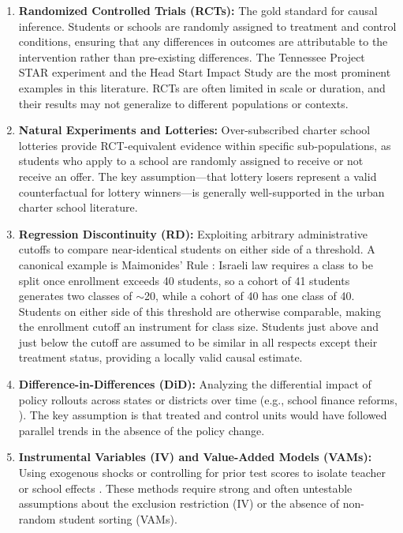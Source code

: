 \documentclass[12pt,letterpaper]{article}
\begin{document}
\begin{enumerate}
    \item \textbf{Randomized Controlled Trials (RCTs):} The gold standard for causal inference. Students or schools are randomly assigned to treatment and control conditions, ensuring that any differences in outcomes are attributable to the intervention rather than pre-existing differences. The Tennessee Project STAR experiment \citep{krueger1999} and the Head Start Impact Study \citep{puma2010} are the most prominent examples in this literature. RCTs are often limited in scale or duration, and their results may not generalize to different populations or contexts.

    \item \textbf{Natural Experiments and Lotteries:} Over-subscribed charter school lotteries \citep{abdulkadirolu2016} provide RCT-equivalent evidence within specific sub-populations, as students who apply to a school are randomly assigned to receive or not receive an offer. The key assumption---that lottery losers represent a valid counterfactual for lottery winners---is generally well-supported in the urban charter school literature.

    \item \textbf{Regression Discontinuity (RD):} Exploiting arbitrary administrative cutoffs to compare near-identical students on either side of a threshold. A canonical example is Maimonides' Rule \citep{angrist1999}: Israeli law requires a class to be split once enrollment exceeds 40 students, so a cohort of 41 students generates two classes of $\sim$20, while a cohort of 40 has one class of 40. Students on either side of this threshold are otherwise comparable, making the enrollment cutoff an instrument for class size. Students just above and just below the cutoff are assumed to be similar in all respects except their treatment status, providing a locally valid causal estimate.

    \item \textbf{Difference-in-Differences (DiD):} Analyzing the differential impact of policy rollouts across states or districts over time (e.g., school finance reforms, \citealt{jackson2016}). The key assumption is that treated and control units would have followed parallel trends in the absence of the policy change.

    \item \textbf{Instrumental Variables (IV) and Value-Added Models (VAMs):} Using exogenous shocks or controlling for prior test scores to isolate teacher or school effects \citep{chetty2014a}. These methods require strong and often untestable assumptions about the exclusion restriction (IV) or the absence of non-random student sorting (VAMs).
\end{enumerate}
\end{document}

